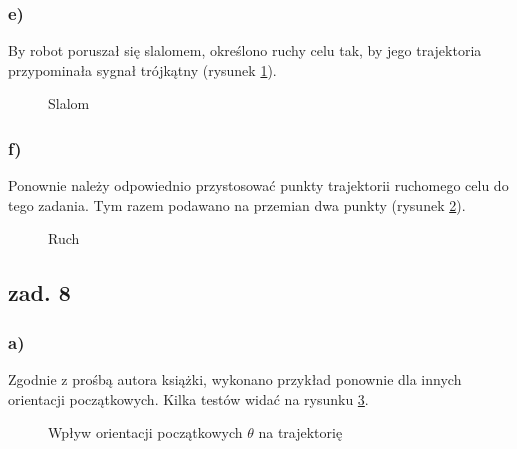 \documentclass[11pt, a4paper]{article}
\begin{document}
%
%

\subsubsection*{e)}

By robot poruszał się slalomem, określono ruchy celu tak, by jego trajektoria przypominała sygnał trójkątny (rysunek \ref{fig:mobile7e}).
\begin{figure}[htbp!]
	\centering
	
	\hfill%
	
	\caption{Slalom \label{fig:mobile7e}}
\end{figure}

\subsubsection*{f)}

Ponownie należy odpowiednio przystosować punkty trajektorii ruchomego celu do tego zadania. Tym razem podawano na przemian dwa punkty (rysunek \ref{fig:mobile7f}).
\begin{figure}[htbp!]
	\centering
	
	\hfill%
	
	\caption{Ruch\label{fig:mobile7f}}
\end{figure}

\subsection*{zad. 8}

\subsubsection*{a)}

Zgodnie z prośbą autora książki, wykonano przykład ponownie dla innych orientacji początkowych. Kilka testów widać na rysunku \ref{fig:mobile8a}.
\begin{figure}[htbp!]
	\centering
	
	\hfill%
	\hfill%

	\caption{Wpływ orientacji początkowych $\theta$ na trajektorię \label{fig:mobile8a}}
\end{figure}
\end{document}

